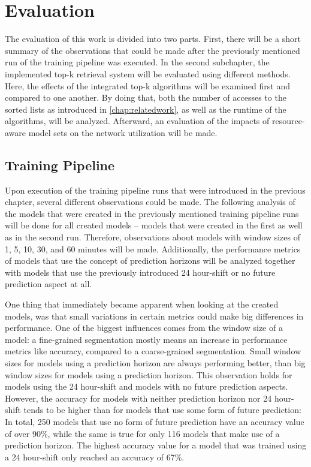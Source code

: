 \chapter{Evaluation} \label{chap:evaluation}

The evaluation of this work is divided into two parts. First, there will be a short summary of the observations that could be made after the previously mentioned run of the training pipeline was executed. In the second subchapter, the implemented top-k retrieval system will be evaluated using different methods. Here, the effects of the integrated top-k algorithms will be examined first and compared to one another. By doing that, both the number of accesses to the sorted lists as introduced in \autoref{chap:relatedwork}, as well as the runtime of the algorithms, will be analyzed. Afterward, an evaluation of the impacts of resource-aware model sets on the network utilization will be made.
  
  
  
  \section{Training Pipeline}
  
  Upon execution of the training pipeline runs that were introduced in the previous chapter, several different observations could be made. The following analysis of the models that were created in the previously mentioned training pipeline runs will be done for all created models – models that were created in the first as well as in the second run. Therefore, observations about models with window sizes of 1, 5, 10, 30, and 60 minutes will be made. Additionally, the performance metrics of models that use the concept of prediction horizons will be analyzed together with models that use the previously introduced 24 hour-shift or no future prediction aspect at all.
  
  One thing that immediately became apparent when looking at the created models, was that small variations in certain metrics could make big differences in performance. One of the biggest influences comes from the window size of a model: a fine-grained segmentation mostly means an increase in performance metrics like accuracy, compared to a coarse-grained segmentation. Small window sizes for models using a prediction horizon are always performing better, than big window sizes for models using a prediction horizon. This observation holds for models using the 24 hour-shift and models with no future prediction aspects. However, the accuracy for models with neither prediction horizon nor 24 hour-shift tends to be higher than for models that use some form of future prediction: In total, 250 models that use no form of future prediction have an accuracy value of over 90\%, while the same is true for only 116 models that make use of a prediction horizon. The highest accuracy value for a model that was trained using a 24 hour-shift only reached an accuracy of 67\%. 
  
